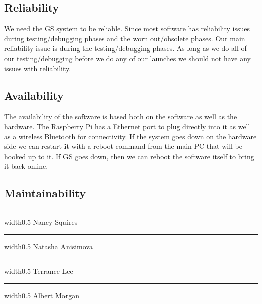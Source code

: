 \documentclass[10pt,journal,draftclsnofoot,onecolumn]{IEEEtran}
\newcommand{\sigline}[1][\empty] {
	\vspace{1in}
	\hrule width0.5\textwidth
	\vspace{1mm}
	\noindent #1	
}
\begin{document}
\subsection{Reliability}
	We need the GS system to be reliable.  Since most software has reliability issues
	during testing/debugging phases and the worn out/obsolete phases.  Our main reliability
	issue is during the testing/debugging phases. As long as we do all of our testing/debugging
	before we do any of our launches we should not have any issues with reliability. 

\subsection{Availability}
	The availability of the software is based both on the software as well as the 
	hardware. The Raspberry Pi has a Ethernet port to plug directly into it as well as
	a wireless Bluetooth for connectivity. If the system goes down on the hardware side
	we can restart it with a reboot command from the main PC that will be hooked up to it.
	If GS goes down, then we can reboot the software itself to bring it back online. 
	
\subsection{Maintainability}

\printindex

\begin{minipage}{\textwidth}
	
	\sigline{Nancy Squires}
	\sigline{Natasha Anisimova}
	\sigline{Terrance Lee}
	\sigline{Albert Morgan}\\
	
\end{minipage}
\end{document}
